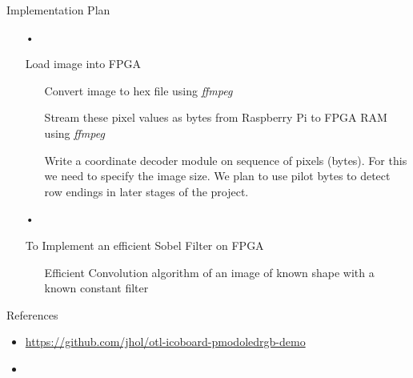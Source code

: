 \documentclass[11pt]{beamer}
\begin{document}
\begin{frame}{Implementation Plan}
	\begin{itemize}
		\item[•] {Load image into FPGA
			\begin{itemize}
				\item[\rightarrow] Convert image to hex file using \textit{ffmpeg}
				\item[\rightarrow] Stream these pixel values as bytes from Raspberry Pi to FPGA RAM using \textit{ffmpeg}
				\item[\rightarrow] Write a coordinate decoder module on sequence of pixels (bytes). For this we need to specify the image size. We plan to use pilot bytes to detect row endings in later stages of the project. 
			\end{itemize}
		}
		\pause
		\item[•] { To Implement an efficient Sobel Filter on FPGA
			\begin{itemize}
				\item[\rightarrow] Efficient Convolution algorithm of an image of known shape with a known constant filter 
			\end{itemize}
		}
	\end{itemize}

\end{frame}

\begin{frame}{References}
\begin{itemize}
\item \href{https://github.com/jhol/otl-icoboard-pmodoledrgb-demo}{https://github.com/jhol/otl-icoboard-pmodoledrgb-demo}
\item \href{https://en.wikipedia.org/wiki/Sobel_operator}{}
\end{itemize}

\end{frame}
\end{document}
